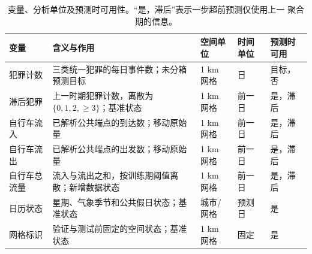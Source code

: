 \begin{table}[!htbp]
\caption{变量、分析单位及预测时可用性。“是，滞后”表示一步超前预测仅使用上一
聚合期的信息。}
\label{tab:variable_availability}
\centering
\footnotesize
\begin{tabularx}{\textwidth}{p{2.3cm}Xp{1.9cm}p{1.9cm}p{2.2cm}}
\toprule
\textbf{变量} & \textbf{含义与作用} & \textbf{空间单位} &
\textbf{时间单位} & \textbf{预测时可用}\\
\midrule
犯罪计数 & 三类统一犯罪的每日事件数；未分箱预测目标 & 1 km 网格 & 日 &
目标，否\\
滞后犯罪 & 上一时期犯罪计数，离散为 \(\{0,1,2,\geq3\}\)；基准状态 &
1 km 网格 & 前一日 & 是，滞后\\
自行车流入 & 已解析公共端点的到达数；移动原始量 & 1 km 网格 & 前一日 &
是，滞后\\
自行车流出 & 已解析公共端点的出发数；移动原始量 & 1 km 网格 & 前一日 &
是，滞后\\
自行车总流量 & 流入与流出之和，按训练期阈值离散；新增数据状态 &
1 km 网格 & 前一日 & 是，滞后\\
日历状态 & 星期、气象季节和公共假日状态；基准状态 & 城市/网格 & 预测日 &
是\\
网格标识 & 验证与测试前固定的空间状态；基准状态 & 1 km 网格 & 固定 & 是\\
\bottomrule
\end{tabularx}
\end{table}

